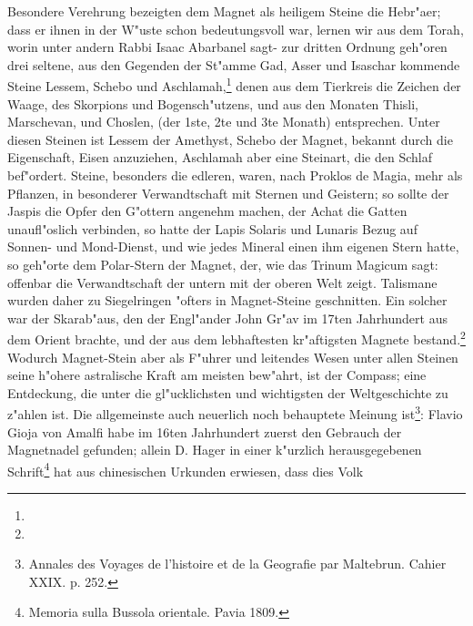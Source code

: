 \documentclass[a4paper, 11pt, oneside, polutonikogreek, german]{article}
\begin{document}
Besondere Verehrung bezeigten dem Magnet als heiligem Steine die Hebr"aer; dass er ihnen in der W"uste schon bedeutungsvoll war, lernen wir aus dem Torah, worin unter andern Rabbi Isaac Abarbanel sagt- zur dritten Ordnung geh"oren drei seltene, aus den Gegenden der St"amme Gad, Asser und Isaschar kommende Steine Lessem, Schebo und Aschlamah,\footnote{} denen aus dem Tierkreis die Zeichen der Waage, des Skorpions und Bogensch"utzens, und aus den Monaten Thisli, Marschevan, und Choslen, (der 1ste, 2te und 3te Monath) entsprechen. Unter diesen Steinen ist Lessem der Amethyst, Schebo der Magnet, bekannt durch die Eigenschaft, Eisen anzuziehen, Aschlamah aber eine Steinart, die den Schlaf bef"ordert. Steine, besonders die edleren, waren, nach Proklos de Magia, mehr als Pflanzen, in besonderer Verwandtschaft mit Sternen und Geistern; so sollte der Jaspis die Opfer den G"ottern angenehm machen, der Achat die Gatten unaufl"oslich verbinden, so hatte der Lapis Solaris und Lunaris Bezug auf Sonnen- und Mond-Dienst, und wie jedes Mineral einen ihm eigenen Stern hatte, so geh"orte dem Polar-Stern der Magnet, der, wie das Trinum Magicum sagt: offenbar die Verwandtschaft der untern mit der oberen Welt zeigt. Talismane wurden daher zu Siegelringen "ofters in Magnet-Steine geschnitten. Ein solcher war der Skarab"aus, den der Engl"ander John Gr"av im 17ten Jahrhundert aus dem Orient brachte, und der aus dem lebhaftesten kr"aftigsten Magnete bestand.\footnote{} Wodurch Magnet-Stein aber als F"uhrer und leitendes Wesen unter allen Steinen seine h"ohere astralische Kraft am meisten bew"ahrt, ist der Compass; eine Entdeckung, die unter die gl"ucklichsten und wichtigsten der Weltgeschichte zu z"ahlen ist. Die allgemeinste auch neuerlich noch behauptete Meinung ist\footnote{Annales des Voyages de l'histoire et de la Geografie par Maltebrun. Cahier XXIX. p. 252.}: Flavio Gioja von Amalfi habe im 16ten Jahrhundert zuerst den Gebrauch der Magnetnadel gefunden; allein D. Hager in einer k"urzlich herausgegebenen Schrift\footnote{Memoria sulla Bussola orientale. Pavia 1809.} hat aus chinesischen Urkunden erwiesen, dass dies Volk 
\end{document}

